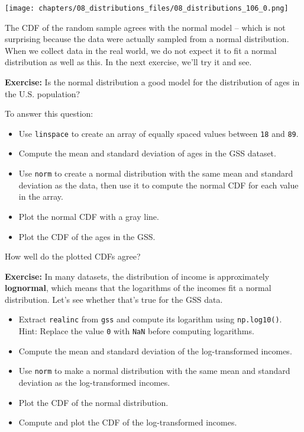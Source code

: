 \begin{center}
\texttt{[image: chapters/08\_distributions\_files/08\_distributions\_106\_0.png]}
\end{center}

The CDF of the random sample agrees with the normal model -- which is
not surprising because the data were actually sampled from a normal
distribution. When we collect data in the real world, we do not expect
it to fit a normal distribution as well as this. In the next exercise,
we'll try it and see.

\textbf{Exercise:} Is the normal distribution a good model for the
distribution of ages in the U.S. population?

To answer this question:

\begin{itemize}
\item
  Use \passthrough{\lstinline!linspace!} to create an array of equally
  spaced values between \passthrough{\lstinline!18!} and
  \passthrough{\lstinline!89!}.
\item
  Compute the mean and standard deviation of ages in the GSS dataset.
\item
  Use \passthrough{\lstinline!norm!} to create a normal distribution
  with the same mean and standard deviation as the data, then use it to
  compute the normal CDF for each value in the array.
\item
  Plot the normal CDF with a gray line.
\item
  Plot the CDF of the ages in the GSS.
\end{itemize}

How well do the plotted CDFs agree?

\textbf{Exercise:} In many datasets, the distribution of income is
approximately \textbf{lognormal}, which means that the logarithms of the
incomes fit a normal distribution. Let's see whether that's true for the
GSS data.

\begin{itemize}
\item
  Extract \passthrough{\lstinline!realinc!} from
  \passthrough{\lstinline!gss!} and compute its logarithm using
  \passthrough{\lstinline!np.log10()!}. Hint: Replace the value
  \passthrough{\lstinline!0!} with \passthrough{\lstinline!NaN!} before
  computing logarithms.
\item
  Compute the mean and standard deviation of the log-transformed
  incomes.
\item
  Use \passthrough{\lstinline!norm!} to make a normal distribution with
  the same mean and standard deviation as the log-transformed incomes.
\item
  Plot the CDF of the normal distribution.
\item
  Compute and plot the CDF of the log-transformed incomes.
\end{itemize}

